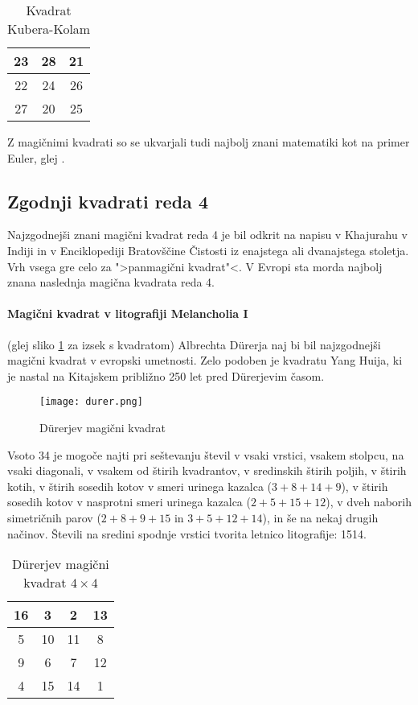 \documentclass[a4paper,12pt]{article}
\theoremstyle{definition}
\theoremstyle{plain}
\newenvironment{magic}[3]
{
   \begin{table}[!ht]
      \centering
      \caption{#2}
      \label{#3}
      \large
      \begin{tabular}{|*{#1}{c|}}
      \hline
}
{
      \end{tabular}
      \normalsize
   \end{table}
}
\begin{document}
\begin{magic}{3}{Kvadrat Kubera-Kolam}{table:kubera}
   23 & 28 & 21 \\\hline
   22 & 24 & 26 \\\hline
   27 & 20 & 25 \\\hline
\end{magic}

Z magičnimi kvadrati so se ukvarjali tudi najbolj znani matematiki kot na
primer Euler, glej \cite{euler}.


\subsection{Zgodnji kvadrati reda 4}

Najzgodnejši znani magični kvadrat reda 4 je bil odkrit na napisu
v Khajurahu v Indiji in v Enciklopediji Bratovščine Čistosti iz enajstega
ali dvanajstega stoletja. Vrh vsega gre celo za ">panmagični kvadrat"<.
V Evropi sta morda najbolj znana naslednja magična kvadrata reda 4.

\paragraph{Magični kvadrat v litografiji Melancholia I}
(glej sliko \ref{fig:durer}
za izsek s kvadratom) Albrechta Dürerja naj bi bil najzgodnejši magični kvadrat
v evropski umetnosti. Zelo podoben je kvadratu Yang Huija, ki je nastal na Kitajskem
približno 250 let pred Dürerjevim časom.
%
\begin{figure}[!ht]
   \centering
   \caption{Dürerjev magični kvadrat}
   \label{fig:durer}
   \texttt{[image: durer.png]}
\end{figure}

Vsoto 34 je mogoče najti pri seštevanju števil v vsaki vrstici, vsakem stolpcu,
na vsaki diagonali, v vsakem od štirih kvadrantov, v sredinskih štirih poljih,
v štirih kotih, v štirih sosedih kotov v smeri urinega kazalca ($3+8+14+9$), v
štirih sosedih kotov v nasprotni smeri urinega kazalca ($2+5+15+12$), v dveh naborih
simetričnih parov ($2+8+9+15$ in $3+5+12+14$), in še na nekaj drugih načinov.
Števili na sredini spodnje vrstici tvorita letnico litografije: 1514.
%
\begin{magic}{4}{Dürerjev magični kvadrat $4\times 4$}{table:durer}
   16 &  3 &  2 & 13 \\\hline
    5 & 10 & 11 &  8 \\\hline
    9 &  6 &  7 & 12 \\\hline
    4 & 15 & 14 &  1 \\\hline
\end{magic}
\end{document}
